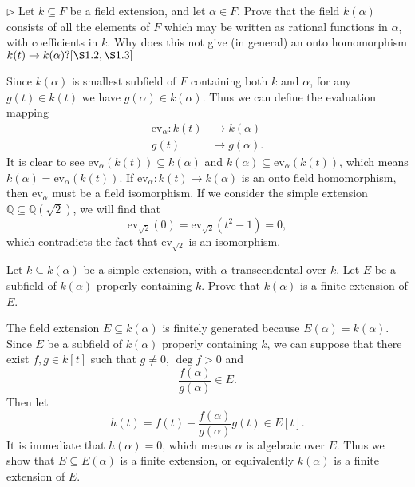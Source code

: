 \documentclass[12pt,letterpaper,boxed]{hmcpset}
\begin{document}
\begin{problem}[1.3]
$\triangleright$ Let $k \subseteq F$ be a field extension, and let $\alpha \in F .$ Prove that the field $k(\alpha)$ consists of all the elements of $F$ which may be written as rational functions in $\alpha$, with coefficients in $k$. Why does this not give (in general) an onto homomorphism $k(t) \rightarrow k(\alpha) ?[\S 1.2, \S 1.3]$
\end{problem}
\begin{solution}
Since $k(\alpha)$ is smallest subfield of $F$ containing both $k$ and $\alpha$, for any $g(t)\in k(t)$ we have $g(\alpha)\in k(\alpha)$. Thus we can define the evaluation mapping
\begin{align*}
	\mathrm{ev}_{\alpha}:k(t) &\longrightarrow k(\alpha)\\
	g(t)&\longmapsto g(\alpha).
\end{align*}
It is clear to see $\mathrm{ev}_{\alpha}(k(t))\subseteq k(\alpha)$ and $k(\alpha)\subseteq \mathrm{ev}_{\alpha}(k(t))$, which means $k(\alpha)= \mathrm{ev}_{\alpha}(k(t))$.
If $\mathrm{ev}_{\alpha}:k(t) \rightarrow k(\alpha)$ is an onto field homomorphism, then $\mathrm{ev}_{\alpha}$ must be a field isomorphism. If we consider the simple extension $\mathbb{Q}\subseteq\mathbb{Q}(\sqrt{2})$, we will find that  
\[
\mathrm{ev}_{\sqrt{2}}(0)=\mathrm{ev}_{\sqrt{2}}(t^2-1)=0,
\]
which contradicts the fact that $\mathrm{ev}_{\sqrt{2}}$ is an isomorphism.
\end{solution}


\begin{problem}[1.4]
Let $k \subseteq k(\alpha)$ be a simple extension, with $\alpha$ transcendental over $k$. Let $E$ be a subfield of $k(\alpha)$ properly containing $k$. Prove that $k(\alpha)$ is a finite extension of $E$.
\end{problem}
\begin{solution}
The field extension $E\subseteq k(\alpha)$ is finitely generated because  $E(\alpha)= k(\alpha)$. Since $E$ be a subfield of $k(\alpha)$ properly containing $k$, we can suppose that there exist $f,g\in k[t]$ such that $g\ne0$, $\deg f>0$ and
\[
\frac{f(\alpha)}{g(\alpha)}\in E.
\]
Then let
\[
h(t)=f(t)-\frac{f(\alpha)}{g(\alpha)}g(t)\in E[t].
\]
It is immediate that $h(\alpha)=0$, which means $\alpha$ is algebraic over $E$. Thus we show that $E\subseteq E(\alpha)$ is a finite extension, or equivalently $k(\alpha)$ is a finite extension of $E$.
\end{solution}
\end{document}
